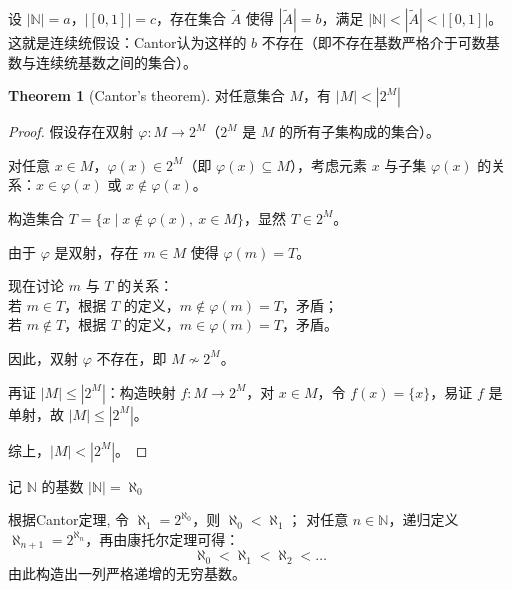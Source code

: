 \documentclass[oneside]{book}
\theoremstyle{definition}
\newtheorem{theorem}{Theorem}[section]
\begin{document}
设 \( |\mathbb{N}| = a \)，\( |[0,1]| = c \)，存在集合 \( \tilde{A} \) 使得 \( |\tilde{A}| = b \)，满足 \( |\mathbb{N}| < |\tilde{A}| < |[0,1]| \)。这就是连续统假设：Cantor认为这样的 \( b \) 不存在（即不存在基数严格介于可数基数与连续统基数之间的集合）。

\begin{theorem}[Cantor's theorem]
	对任意集合 \( M \)，有 \( |M| < |2^M| \)
\end{theorem}

\begin{proof}
	假设存在双射 \( \varphi: M \to 2^M \)（\( 2^M \) 是 \( M \) 的所有子集构成的集合）。
	
	对任意 \( x \in M \)，\( \varphi(x) \in 2^M \)（即 \( \varphi(x) \subseteq M \)），考虑元素 \( x \) 与子集 \( \varphi(x) \) 的关系：\( x \in \varphi(x) \) 或 \( x \notin \varphi(x) \)。
	
	构造集合 \( T = \{ x \mid x \notin \varphi(x),\ x \in M \} \)，显然 \( T \in 2^M \)。
	
	由于 \( \varphi \) 是双射，存在 \( m \in M \) 使得 \( \varphi(m) = T \)。
	
	现在讨论 \( m \) 与 \( T \) 的关系：\\
	若 \( m \in T \)，根据 \( T \) 的定义，\( m \notin \varphi(m) = T \)，矛盾；\\
	若 \( m \notin T \)，根据 \( T \) 的定义，\( m \in \varphi(m) = T \)，矛盾。
	
	因此，双射 \( \varphi \) 不存在，即 \( M \not\sim 2^M \)。
	
	再证 \( |M| \leq |2^M| \)：构造映射 \( f: M \to 2^M \)，对 \( x \in M \)，令 \( f(x) = \{ x \} \)，易证 \( f \) 是单射，故 \( |M| \leq |2^M| \)。
	
	综上，\( |M| < |2^M| \)。
\end{proof}

记 \( \mathbb{N} \) 的基数 \( |\mathbb{N}| = \aleph_0 \)\

根据Cantor定理,
令 \( \aleph_1 = 2^{\aleph_0} \)，则 \( \aleph_0 < \aleph_1 \)；
对任意 \( n \in \mathbb{N} \)，递归定义 \( \aleph_{n+1} = 2^{\aleph_n} \)，再由康托尔定理可得：
\[
\aleph_0 < \aleph_1 < \aleph_2 < \dots
\]
由此构造出一列严格递增的无穷基数。
\end{document}
